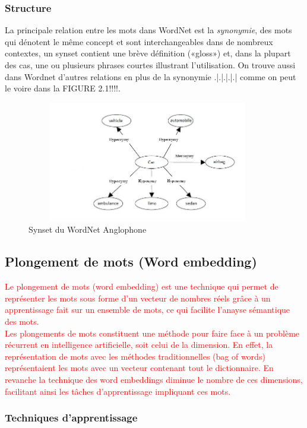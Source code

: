         \subsubsection{Structure}
        La principale relation entre les mots dans WordNet est la \emph{synonymie}, des mots qui dénotent le même concept et sont interchangeables dans de nombreux contextes, un synset contient une brève définition («gloss») et, dans la plupart des cas, une ou plusieurs phrases courtes illustrant l'utilisation. On trouve aussi dans Wordnet d'autres relations en plus de la synonymie .|.|.|.|.| comme on peut le voire dans la FIGURE 2.1!!!!. 
        \begin{figure}[H]
            \centering
                \includegraphics[height=150pt,width=300pt]{img/chapter2/wordnet.jpg}
            \caption{Synset du WordNet Anglophone}
        \end{figure}
    
    
    \subsection{Plongement de mots (Word embedding)}
    
     \textcolor{red}{Le plongement de mots (word embedding) est une technique qui permet de représenter les mots sous forme d'un vecteur de nombres réels grâce à un apprentissage fait sur un ensemble de mots, ce qui facilite l'anayse sémantique des mots.\\
    Les plongements de mots constituent une méthode pour faire face à un problème récurrent en intelligence artificielle, soit celui de la dimension. En effet, la représentation de mots avec les méthodes traditionnelles (bag of words) représentaient les mots avec un vecteur contenant tout le dictionnaire. En revanche la technique des word embeddings diminue le nombre de ces dimensions, facilitant ainsi les tâches d'apprentissage impliquant ces mots.}
    
    
    \subsubsection{Techniques d'apprentissage}
    
